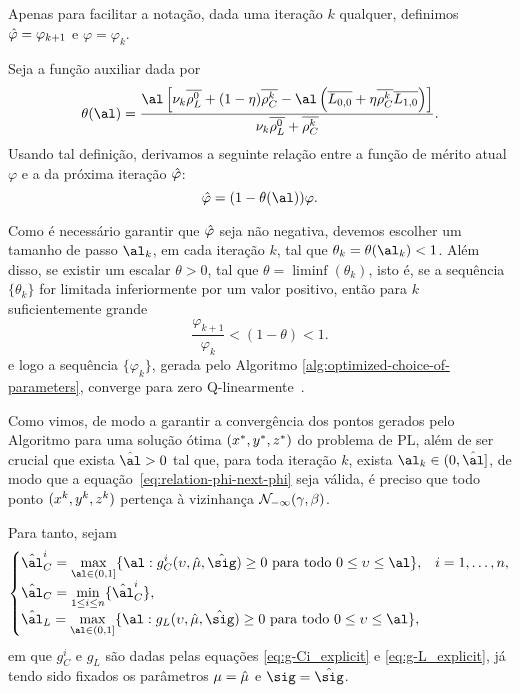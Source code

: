 Apenas para facilitar a notação, dada uma iteração $k$ qualquer, definimos $\hat{\varphi} = \varphi_{k+1}$ e $\varphi = \varphi_{k}$.

Seja a função auxiliar  dada por
\begin{equation}
	\label{eq:theta}
\theta(\al) =  \dfrac{\al\left[ \nuk \dbvec{\rho_L^{0}} + (1-\eta)\rhoCkb  - \al\left(\dbvec{L_{0,0}} + \eta\rhoCkb  \dbvec{L_{1,0}}
\right) \right]}{\nuk \dbvec{\rho_L^{0}} +
\rhoCkb }.
\end{equation}
Usando tal definição, derivamos a seguinte relação entre a função de mérito atual  $\varphi$  e a da próxima iteração  $\hat{\varphi}$: 
\begin{equation}
	\label{eq:relation-phi-next-phi}
	 			{\nextphi} = (1- \theta(\al))\varphi.
\end{equation}


Como é necessário garantir que  $\hat{\varphi}  $  seja não negativa, devemos escolher um tamanho de passo  $\al_k$, em cada iteração $k$, tal que  $\theta_k = \theta(\al_k)<1$. Além disso, se existir um escalar $\theta>0$, tal que $\theta = \liminf (\theta_k)$, isto é, se a sequência $\{\theta_k\}$ for limitada inferiormente por um valor positivo,	 então para $k$ suficientemente grande
\[
\frac{{\varphi_{k+1}}}{\varphi_{k}} < (1- \theta) < 1.
\]
e logo a sequência $\{\varphi_k\}$, gerada pelo Algoritmo \ref{alg:optimized-choice-of-parameters}, converge para zero Q-linearmente~\cite{Ortega:2000vd}.




Como vimos, de modo a garantir a convergência dos pontos gerados pelo Algoritmo para uma solução ótima $(x^*,y^*,z^*)$ do problema de \ac{PL}, além de ser  crucial que exista $\hat{\al}>0$  tal que,  para toda iteração $k$, exista  $\al_k\in(0,\hat{\al}]$, de modo que a equação~\eqref{eq:relation-phi-next-phi} seja válida, é preciso que todo   ponto  $(x^{k} ,y^{k},z^{k})$ pertença à vizinhança $\mathcal{N}_{-\infty}(\gamma,\beta)$.

Para tanto, sejam  
\begin{equation}
	\label{eq:al-C+al-L}
\begin{cases}
	\hat{\al}_{C}^{i} = \displaystyle \max_{\al\in (0,1]} \{ \al : g_{C}^{i}(\upsilon,\nextmu,\nextsig)\geq0 \text{ para todo } 0 \leq \upsilon\leq \al  \}, & i = 1,\ldots,n,\\
	\hat{\al}_{C} = \displaystyle \min_{1\leq i \leq n} \{\hat{\al}_{C}^{i}\}, \\
	\hat{\al}_{L} = \displaystyle \max_{\al\in (0,1]} \{ \al : g_{L}(\upsilon,\nextmu,\nextsig)\geq0 \text{ para todo } 0 \leq  \upsilon\leq \al  \},
\end{cases}
\end{equation}
em que $g_{C}^{i}$ e $g_{L}$ são dadas pelas equações  \eqref{eq:g-Ci_explicit} e \eqref{eq:g-L_explicit}, já tendo sido fixados os parâmetros $\mu=\hat{\mu}$ e $\sig=\nextsig$.


